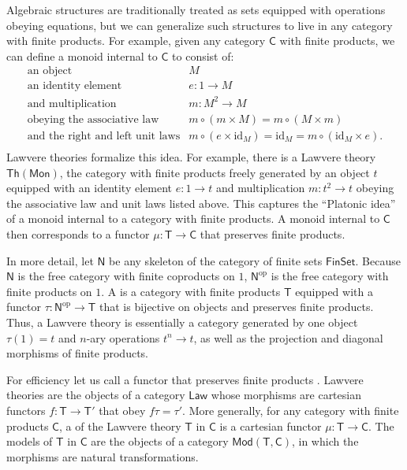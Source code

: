 \documentclass{amsart}
\newcommand{\define}[1]{{\bf \boldmath{#1}}}
\theoremstyle{definition}
\newcommand{\Th}{\mathsf{Th}}
\newcommand{\Law}{\mathsf{Law}}
\newcommand{\Mon}{\mathsf{Mon}}
\newcommand{\Mod}{\mathsf{Mod}}
\newcommand{\FinSet}{\mathsf{FinSet}}
\newcommand{\NN}{\mathsf{N}}
\newcommand{\C}{\mathsf{C}}
\newcommand{\T}{\mathsf{T}}
\newcommand{\op}{\mathrm{op}}
\newcommand{\maps}{\colon}
\newcommand{\id}{\mathrm{id}}
\begin{document}
Algebraic structures are traditionally treated as sets equipped with operations obeying equations, but we can generalize such structures to live in any category with finite products.  For example,
given any category $\C$ with finite products, we can define a monoid internal to $\C$ to consist of:
\[\begin{array}{rl}
\text{an object} & M\\
\text{an identity element} & e\maps 1 \to M\\
\text{and multiplication} & m\maps M^2 \to M\\
\text{obeying the associative law} & m \circ (m \times M) = m \circ (M \times m)\\
\text{and the right and left unit laws} & m \circ (e  \times \id_M) = \id_M = m \circ (\id_M \times e).\\
\end{array}\]
Lawvere theories formalize this idea.  For example, there is a Lawvere theory $\Th(\Mon)$, the category with finite products freely generated by an object $t$ equipped with an identity element $e \maps 1 \to t$ and multiplication $m \maps t^2 \to t$ obeying the associative law and unit laws listed above.    This captures the ``Platonic idea'' of a monoid internal to a category with finite products.  A monoid internal to $\C$ then corresponds to a functor $\mu \maps \T \to \C$ that preserves finite products.  

In more detail, let $\NN$ be any skeleton of the category of finite sets $\FinSet$.  Because $\NN$ is the free category with finite coproducts on $1$, $\NN^\op$ is the free category with finite products on $1$.   A \define{Lawvere theory} is a category with finite products $\T$ equipped with a functor $\tau \maps \NN^\op \to \T$ that is bijective on objects and preserves finite products.   Thus, a Lawvere theory is essentially a category generated by one object $\tau(1) = t$ and $n$-ary operations $t^n \to t$, as well as the projection and diagonal morphisms of finite products.

For efficiency let us call a functor that preserves finite products \define{cartesian}.   Lawvere theories are the objects of a category $\Law$ whose morphisms are cartesian functors $f \maps \T\to \T'$ that obey $f\tau = \tau'$.   More generally, for any category with finite products $\C$, a \define{model} of the Lawvere theory $\T$ in $\C$ is a cartesian functor $\mu \maps \T \to \C$.  The models of $\T$ in $\C$ are the objects of a category $\Mod(\T,\C)$, in which the morphisms are natural transformations.  
\end{document}
